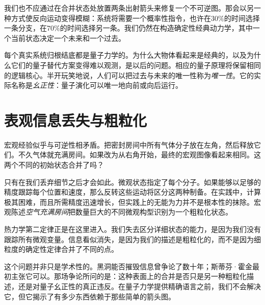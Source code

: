 \begin{classroomqa}
\end{classroomqa}

我们也不应通过在合并状态处放置两条出射箭头来修复一个不可逆图。那会以另一种方式使反向运动变得模糊：系统将需要一个概率性指令，也许在\(30\%\)的时间选择一条分支，在\(70\%\)的时间选择另一条。我们仍然在构造确定性经典动力学，其中一个当前状态决定一个未来和一个过去。

每个真实系统归根结底都是量子力学的。为什么大物体看起来是经典的，以及为什么它们的量子替代方案变得难以观测，是以后的问题。相应的量子原理将保留相同的逻辑核心。半开玩笑地说，人们可以把过去与未来的唯一性称为\emph{唯一性}。它的实际名称是\emph{幺正性}：量子演化可以唯一地向前或向后运行。

\section{表观信息丢失与粗粒化}

宏观经验似乎与可逆性相矛盾。把密封房间中所有气体分子放在左角，然后释放它们。不久气体就充满房间。如果改为从右角开始，最终的宏观图像看起来相同。这两个不同的初始状态合并了吗？

只有在我们丢弃细节之后才会如此。微观状态指定了每个分子。如果能够以足够的精度跟踪每个位置和速度，那么反转这些运动将区分这两种制备。在实践中，计算极其困难，而且所需精度迅速增长，但实践上的无能为力并不是根本性的抹除。宏观陈述\emph{空气充满房间}把数量巨大的不同微观构型识别为一个粗粒化状态。

热力学第二定律正是在这里进入。我们失去区分详细状态的能力，是因为我们没有跟踪所有微观变量。信息看似消失，是因为我们的描述是粗粒化的，而不是因为细粒度的确定性定律合并了不同的点。

\begin{classroomqa}
\end{classroomqa}

这个问题并非只是学术性的。黑洞能否摧毁信息曾争论了数十年；斯蒂芬·霍金最初主张它可以。那场争论所问的是：这种表面上的合并是否只是另一种粗粒化描述，还是对量子幺正性的真正违反。在量子力学提供精确语言之前，我们不会解决它，但它揭示了有多少东西依赖于那些简单的箭头图。

